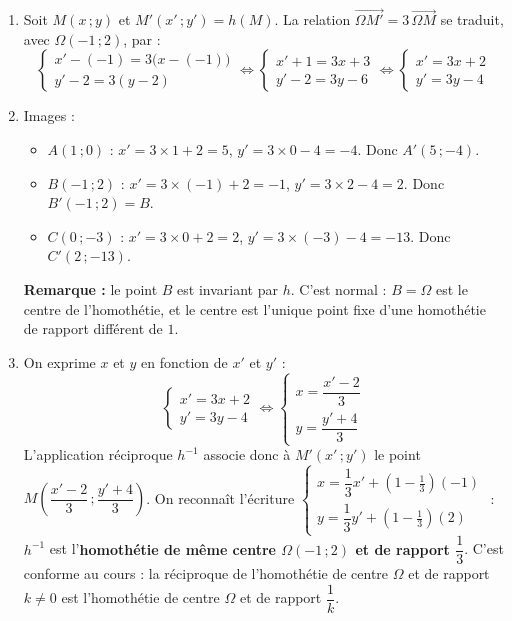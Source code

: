 \documentclass[11pt]{article}
\newcommand{\cle}[1]{{\popxbold\color{popdark}#1}}
\begin{document}
\begin{corrige}
\begin{enumerate}
\item Soit $M(x\,;y)$ et $M'(x'\,;y') = h(M)$. La relation $\overrightarrow{\Omega M'} = 3\,\overrightarrow{\Omega M}$ se traduit, avec $\Omega(-1\,;2)$, par :
\[ \begin{cases} x' - (-1) = 3\big(x - (-1)\big) \\ y' - 2 = 3(y - 2) \end{cases} \iff \begin{cases} x' + 1 = 3x + 3 \\ y' - 2 = 3y - 6 \end{cases} \iff \begin{cases} x' = 3x + 2 \\ y' = 3y - 4 \end{cases} \]
\item Images :
\begin{itemize}
\item $A(1\,;0)$ : $x' = 3 \times 1 + 2 = 5$, $y' = 3 \times 0 - 4 = -4$. Donc $A'(5\,;-4)$.
\item $B(-1\,;2)$ : $x' = 3 \times (-1) + 2 = -1$, $y' = 3 \times 2 - 4 = 2$. Donc $B'(-1\,;2) = B$.
\item $C(0\,;-3)$ : $x' = 3 \times 0 + 2 = 2$, $y' = 3 \times (-3) - 4 = -13$. Donc $C'(2\,;-13)$.
\end{itemize}
\textbf{Remarque :} le point $B$ est invariant par $h$. C'est normal : $B = \Omega$ est le \cle{centre} de l'homothétie, et le centre est l'unique point fixe d'une homothétie de rapport différent de $1$.
\item On exprime $x$ et $y$ en fonction de $x'$ et $y'$ :
\[ \begin{cases} x' = 3x + 2 \\ y' = 3y - 4 \end{cases} \iff \begin{cases} x = \dfrac{x' - 2}{3} \\ y = \dfrac{y' + 4}{3} \end{cases} \]
L'application réciproque $h^{-1}$ associe donc à $M'(x'\,;y')$ le point $M\left(\dfrac{x'-2}{3}\,;\dfrac{y'+4}{3}\right)$. On reconnaît l'écriture $\begin{cases} x = \dfrac{1}{3}x' + (1-\tfrac{1}{3})(-1) \\ y = \dfrac{1}{3}y' + (1-\tfrac{1}{3})(2) \end{cases}$ : $h^{-1}$ est l'\textbf{homothétie de même centre $\Omega(-1\,;2)$ et de rapport $\dfrac{1}{3}$}. C'est conforme au cours : la réciproque de l'homothétie de centre $\Omega$ et de rapport $k \neq 0$ est l'homothétie de centre $\Omega$ et de rapport $\dfrac{1}{k}$.
\end{enumerate}
\end{corrige}
\end{document}
